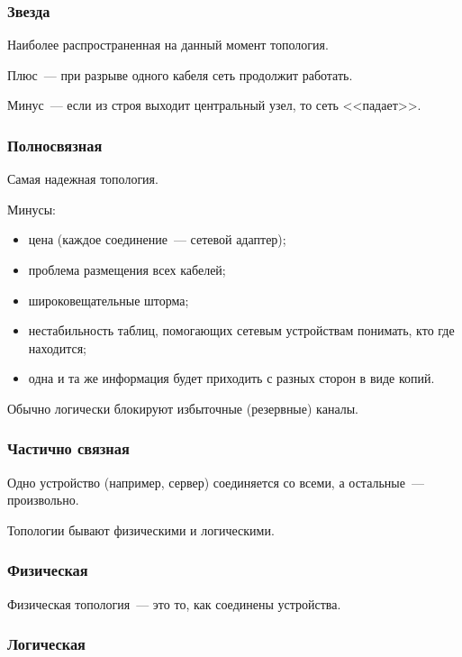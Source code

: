 \subsubsection{Звезда}

Наиболее распространенная на данный момент топология.


Плюс~--- при разрыве одного кабеля сеть продолжит работать.

Минус~--- если из строя выходит центральный узел, то сеть <<падает>>.

\subsubsection{Полносвязная}

Самая надежная топология.


Минусы:

\begin{itemize}
    \item цена (каждое соединение~--- сетевой адаптер);
    \item проблема размещения всех кабелей;
    \item широковещательные шторма;
    \item нестабильность таблиц, помогающих сетевым устройствам понимать, кто где находится;
    \item одна и та же информация будет приходить с разных сторон в виде копий.
\end{itemize}

Обычно логически блокируют избыточные (резервные) каналы.

\subsubsection{Частично связная}

Одно устройство (например, сервер) соединяется со всеми, а остальные~--- произвольно.

Топологии бывают физическими и логическими.

\subsubsection{Физическая}

Физическая топология~--- это то, как соединены устройства.

\subsubsection{Логическая}

